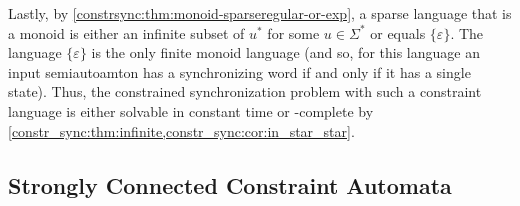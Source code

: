 Lastly, by \cref{constrsync:thm:monoid-sparseregular-or-exp}, a sparse language that is a monoid is either
an infinite subset of $u^*$ for some $u \in \Sigma^*$
or equals $\{\varepsilon\}$. The language $\{\varepsilon\}$ is the only finite monoid language (and so, for this language
an input semiautoamton has a synchronizing word if and only if it has a single state).
Thus, the constrained synchronization problem with such a constraint language is either solvable in constant
time or \LOGSPACE-complete by \cref{constr_sync:thm:infinite,constr_sync:cor:in_star_star}.

\subsection{Strongly Connected Constraint Automata}
\label{sec:constr_sync:SCC} 

